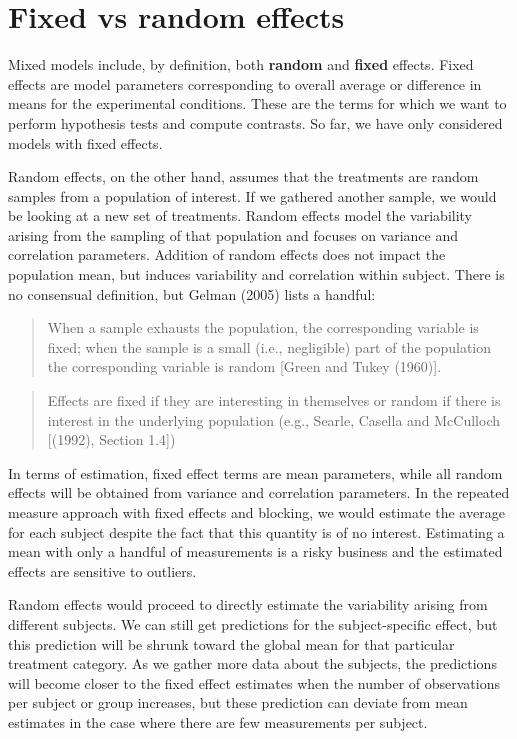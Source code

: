 \documentclass[
  11pt,
  letterpaper,
]{scrbook}
\theoremstyle{definition}
\theoremstyle{definition}
\theoremstyle{remark}
\begin{document}
\section{Fixed vs random effects}\label{fixed-vs-random-effects}

Mixed models include, by definition, both \textbf{random} and
\textbf{fixed} effects. Fixed effects are model parameters corresponding
to overall average or difference in means for the experimental
conditions. These are the terms for which we want to perform hypothesis
tests and compute contrasts. So far, we have only considered models with
fixed effects.

Random effects, on the other hand, assumes that the treatments are
random samples from a population of interest. If we gathered another
sample, we would be looking at a new set of treatments. Random effects
model the variability arising from the sampling of that population and
focuses on variance and correlation parameters. Addition of random
effects does not impact the population mean, but induces variability and
correlation within subject. There is no consensual definition, but
Gelman (2005) lists a handful:

\begin{quote}
When a sample exhausts the population, the corresponding variable is
fixed; when the sample is a small (i.e., negligible) part of the
population the corresponding variable is random {[}Green and Tukey
(1960){]}.
\end{quote}

\begin{quote}
Effects are fixed if they are interesting in themselves or random if
there is interest in the underlying population (e.g., Searle, Casella
and McCulloch {[}(1992), Section 1.4{]})
\end{quote}

In terms of estimation, fixed effect terms are mean parameters, while
all random effects will be obtained from variance and correlation
parameters. In the repeated measure approach with fixed effects and
blocking, we would estimate the average for each subject despite the
fact that this quantity is of no interest. Estimating a mean with only a
handful of measurements is a risky business and the estimated effects
are sensitive to outliers.

Random effects would proceed to directly estimate the variability
arising from different subjects. We can still get predictions for the
subject-specific effect, but this prediction will be shrunk toward the
global mean for that particular treatment category. As we gather more
data about the subjects, the predictions will become closer to the fixed
effect estimates when the number of observations per subject or group
increases, but these prediction can deviate from mean estimates in the
case where there are few measurements per subject.
\end{document}
